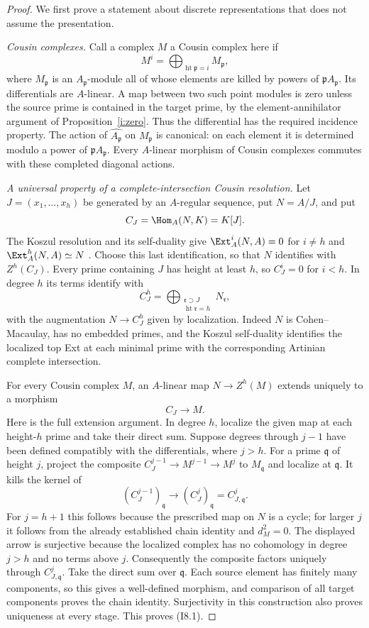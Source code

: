 \begin{proof}
We first prove a statement about discrete representations that does
not assume the presentation.

\emph{Cousin complexes.}
Call a complex $M$ a Cousin complex here if
\[
 M^i=\bigoplus_{\operatorname{ht}\mathfrak p=i}M_{\mathfrak p},
\]
where $M_{\mathfrak p}$ is an $A_{\mathfrak p}$-module all of whose
elements are killed by powers of $\mathfrak pA_{\mathfrak p}$.
Its differentials are $A$-linear. A map between two such point
modules is zero unless the source prime is contained in the target
prime, by the element-annihilator argument of
Proposition~\ref{i:zero}. Thus the differential has the required
incidence property. The action of
$\widehat{A_{\mathfrak p}}$ on $M_{\mathfrak p}$ is canonical:
on each element it is determined modulo a power of
$\mathfrak pA_{\mathfrak p}$. Every $A$-linear morphism of Cousin
complexes commutes with these completed diagonal actions.

\emph{A universal property of a complete-intersection Cousin
resolution.}
Let $J=(x_1,\ldots,x_h)$ be generated by an $A$-regular sequence,
put $N=A/J$, and put
\[
 C_J=\Hom_A(N,K)=K[J].
\]
The Koszul resolution and its self-duality give
$\Ext_A^i(N,A)=0$ for $i\ne h$ and
$\Ext_A^h(N,A)\simeq N$
\cite[Lemma 48.15.5, tag 0BQZ]{StacksKoszulDuality}.
Choose this last identification, so that
$N$ identifies with $Z^h(C_J)$. Every prime containing $J$ has
height at least $h$, so $C_J^i=0$ for $i<h$. In degree $h$ its
terms identify with
\[
 C_J^h=\bigoplus_{\substack{\mathfrak r\supset J\\
                            \operatorname{ht}\mathfrak r=h}}
 N_{\mathfrak r},
\]
with the augmentation $N\to C_J^h$ given by localization.
Indeed $N$ is Cohen--Macaulay, has no embedded primes, and the
Koszul self-duality identifies the localized top Ext at each
minimal prime with the corresponding Artinian complete intersection.

For every Cousin complex $M$, an $A$-linear map
$N\to Z^h(M)$ extends uniquely to a morphism
\[
                         C_J\longrightarrow M.          \tag{I8.1}
\]
Here is the full extension argument. In degree $h$, localize the
given map at each height-$h$ prime and take their direct sum. Suppose
degrees through $j-1$ have been defined compatibly with the
differentials, where $j>h$. For a prime $\mathfrak q$ of height
$j$, project the composite
$C_J^{j-1}\to M^{j-1}\to M^j$ to $M_{\mathfrak q}$ and
localize at $\mathfrak q$. It kills the kernel of
\[
 (C_J^{j-1})_{\mathfrak q}\longrightarrow
 (C_J^j)_{\mathfrak q}=C_{J,\mathfrak q}^j.
\]
For $j=h+1$ this follows because the prescribed map on $N$ is a
cycle; for larger $j$ it follows from the already established chain
identity and $d_M^2=0$. The displayed arrow is surjective because
the localized complex has no cohomology in degree $j>h$ and no
terms above $j$. Consequently the composite factors uniquely
through $C_{J,\mathfrak q}^j$. Take the direct sum over
$\mathfrak q$. Each source element has finitely many components,
so this gives a well-defined morphism, and comparison of all target
components proves the chain identity. Surjectivity in this
construction also proves uniqueness at every stage. This proves
(I8.1).


\end{proof}
